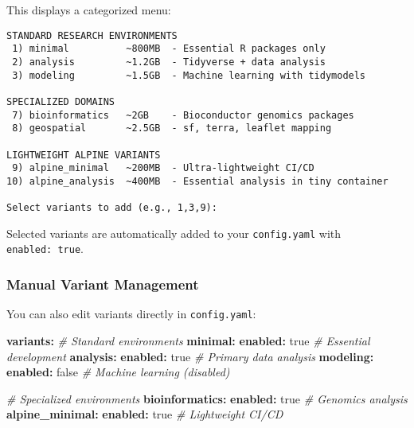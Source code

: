 \documentclass[
]{article}
\newenvironment{Shaded}{\begin{snugshade}}{\end{snugshade}}
\newcommand{\AttributeTok}[1]{\textcolor[rgb]{0.13,0.29,0.53}{#1}}
\newcommand{\CharTok}[1]{\textcolor[rgb]{0.31,0.60,0.02}{#1}}
\newcommand{\CommentTok}[1]{\textcolor[rgb]{0.56,0.35,0.01}{\textit{#1}}}
\newcommand{\FunctionTok}[1]{\textcolor[rgb]{0.13,0.29,0.53}{\textbf{#1}}}
\newcommand{\KeywordTok}[1]{\textcolor[rgb]{0.13,0.29,0.53}{\textbf{#1}}}
\begin{document}
This displays a categorized menu:

\begin{verbatim}
STANDARD RESEARCH ENVIRONMENTS
 1) minimal          ~800MB  - Essential R packages only
 2) analysis         ~1.2GB  - Tidyverse + data analysis
 3) modeling         ~1.5GB  - Machine learning with tidymodels

SPECIALIZED DOMAINS
 7) bioinformatics   ~2GB    - Bioconductor genomics packages
 8) geospatial       ~2.5GB  - sf, terra, leaflet mapping

LIGHTWEIGHT ALPINE VARIANTS
 9) alpine_minimal   ~200MB  - Ultra-lightweight CI/CD
10) alpine_analysis  ~400MB  - Essential analysis in tiny container

Select variants to add (e.g., 1,3,9):
\end{verbatim}

Selected variants are automatically added to your \texttt{config.yaml}
with \texttt{enabled:\ true}.

\subsubsection{Manual Variant
Management}\label{manual-variant-management}

You can also edit variants directly in \texttt{config.yaml}:

\begin{Shaded}
\begin{Highlighting}[]
\FunctionTok{variants}\KeywordTok{:}
\CommentTok{  \# Standard environments}
\AttributeTok{  }\FunctionTok{minimal}\KeywordTok{:}
\AttributeTok{    }\FunctionTok{enabled}\KeywordTok{:}\AttributeTok{ }\CharTok{true}\CommentTok{     \# Essential development}
\AttributeTok{  }\FunctionTok{analysis}\KeywordTok{:}
\AttributeTok{    }\FunctionTok{enabled}\KeywordTok{:}\AttributeTok{ }\CharTok{true}\CommentTok{     \# Primary data analysis}
\AttributeTok{  }\FunctionTok{modeling}\KeywordTok{:}
\AttributeTok{    }\FunctionTok{enabled}\KeywordTok{:}\AttributeTok{ }\CharTok{false}\CommentTok{    \# Machine learning (disabled)}

\CommentTok{  \# Specialized environments}
\AttributeTok{  }\FunctionTok{bioinformatics}\KeywordTok{:}
\AttributeTok{    }\FunctionTok{enabled}\KeywordTok{:}\AttributeTok{ }\CharTok{true}\CommentTok{     \# Genomics analysis}
\AttributeTok{  }\FunctionTok{alpine\_minimal}\KeywordTok{:}
\AttributeTok{    }\FunctionTok{enabled}\KeywordTok{:}\AttributeTok{ }\CharTok{true}\CommentTok{     \# Lightweight CI/CD}
\end{Highlighting}
\end{Shaded}
\end{document}
